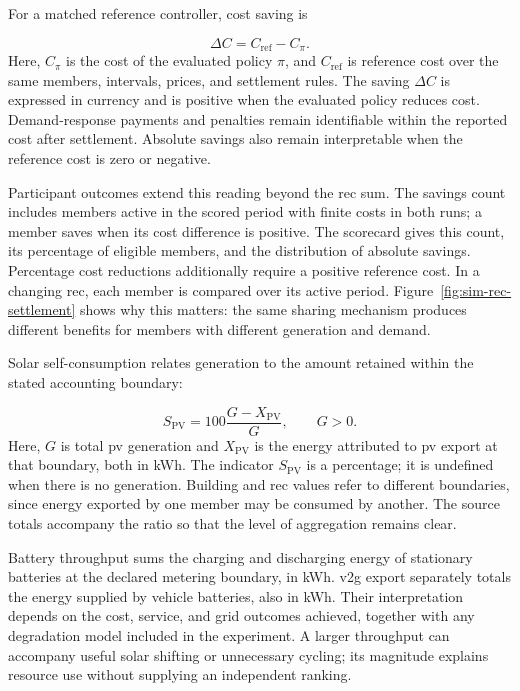 For a matched reference controller, cost saving is
\begin{samepage}
\begin{equation}
\Delta C=C_{\mathrm{ref}}-C_{\pi}.
\label{eq:sim-cost-saving}
\end{equation}
Here, $C_{\pi}$ is the cost of the evaluated policy $\pi$, and $C_{\mathrm{ref}}$ is reference cost over the same members, intervals, prices, and settlement rules. The saving $\Delta C$ is expressed in currency and is positive when the evaluated policy reduces cost. Demand-response payments and penalties remain identifiable within the reported cost after settlement. Absolute savings also remain interpretable when the reference cost is zero or negative.\par
\end{samepage}

Participant outcomes extend this reading beyond the \gls{rec} sum. The savings count includes members active in the scored period with finite costs in both runs; a member saves when its cost difference is positive. The scorecard gives this count, its percentage of eligible members, and the distribution of absolute savings. Percentage cost reductions additionally require a positive reference cost. In a changing \gls{rec}, each member is compared over its active period. Figure~\ref{fig:sim-rec-settlement} shows why this matters: the same sharing mechanism produces different benefits for members with different generation and demand.

Solar self-consumption relates generation to the amount retained within the stated accounting boundary:
\begin{samepage}
\begin{equation}
S_{\mathrm{PV}}=100\frac{G-X_{\mathrm{PV}}}{G},\qquad G>0.
\label{eq:sim-solar-use}
\end{equation}
Here, $G$ is total \gls{pv} generation and $X_{\mathrm{PV}}$ is the energy attributed to \gls{pv} export at that boundary, both in kWh. The indicator $S_{\mathrm{PV}}$ is a percentage; it is undefined when there is no generation. Building and \gls{rec} values refer to different boundaries, since energy exported by one member may be consumed by another. The source totals accompany the ratio so that the level of aggregation remains clear.\par
\end{samepage}

Battery throughput sums the charging and discharging energy of stationary batteries at the declared metering boundary, in kWh. \gls{v2g} export separately totals the energy supplied by vehicle batteries, also in kWh. Their interpretation depends on the cost, service, and grid outcomes achieved, together with any degradation model included in the experiment. A larger throughput can accompany useful solar shifting or unnecessary cycling; its magnitude explains resource use without supplying an independent ranking.

